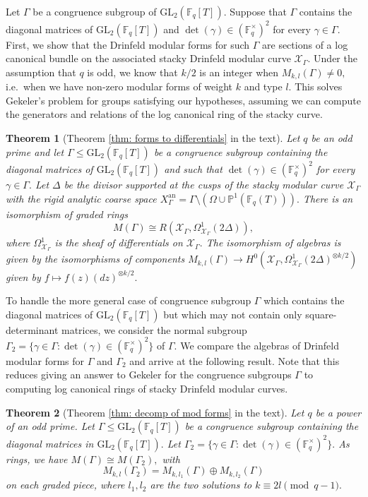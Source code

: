 \documentclass[11pt]{amsart}
\newtheorem{theorem}{Theorem}[section]
\theoremstyle{definition}
\numberwithin{equation}{section}
\newcommand{\GL}{\mathrm{GL}} 	%
\newcommand{\sX}{\mathscr{X}}		%
\newcommand{\bbF}{\mathbb{F}}		%
\newcommand{\bbP}{\mathbb{P}}		%
\begin{document}
		Let $\Gamma$ be a congruence subgroup of $\GL_2(\bbF_q[T]).$ Suppose that $\Gamma$ contains the diagonal matrices of $\GL_2(\bbF_q[T])$ and $\det(\gamma)\in (\bbF_q^{\times})^2$ for every $\gamma\in \Gamma.$ First, we show that the Drinfeld modular forms for such $\Gamma$ are sections of a log canonical bundle on the associated stacky Drinfeld modular curve $\sX_{\Gamma}.$ Under the assumption that $q$ is odd, we know that $k/2$ is an integer when $M_{k,l}(\Gamma)\neq 0,$ i.e.\ when we have non-zero modular forms of weight $k$ and type $l.$ This solves Gekeler's problem for groups satisfying our hypotheses, assuming we can compute the generators and relations of the log canonical ring of the stacky curve.
		\begin{theorem}[Theorem \ref{thm: forms to differentials} in the text]
			Let $q$ be an odd prime and let $\Gamma\leq \GL_2(\bbF_q[T])$ be a congruence subgroup containing the diagonal matrices of $\GL_2(\bbF_q[T])$ and such that $\det(\gamma)\in (\bbF_q^{\times})^2$ for every $\gamma\in \Gamma.$ Let $\Delta$ be the divisor supported at the cusps of the stacky modular curve $\sX_{\Gamma}$ with the rigid analytic coarse space $X_{\Gamma}^{\text{an}}=\Gamma\setminus(\Omega\cup \bbP^1(\bbF_q(T))).$ 
			There is an isomorphism of graded rings \[M(\Gamma)\cong R(\sX_{\Gamma},\Omega^1_{\sX_{\Gamma}}(2\Delta)),\] where $\Omega^1_{\sX_{\Gamma}}$ is the sheaf of differentials on $\sX_{\Gamma}.$ The isomorphism of algebras is given by the isomorphisms of components $M_{k,l}(\Gamma)\to H^0(\sX_{\Gamma},\Omega^1_{\sX_{\Gamma}}(2\Delta)^{\otimes k/2})$ given by $f\mapsto f(z)(dz)^{\otimes k/2}.$ 
		\end{theorem}
		
		To handle the more general case of congruence subgroup $\Gamma$ which contains the diagonal matrices of $\GL_2(\bbF_q[T])$ but which may not contain only square-determinant matrices, we consider the normal subgroup $\Gamma_2=\{\gamma\in \Gamma: \det(\gamma)\in (\bbF_q^{\times})^2\}$ of $\Gamma.$ We compare the algebras of Drinfeld modular forms for $\Gamma$ and $\Gamma_2$ and arrive at the following result. Note that this reduces giving an answer to Gekeler for the congruence subgroups $\Gamma$ to computing log canonical rings of stacky Drinfeld modular curves.
		\begin{theorem}[Theorem \ref{thm: decomp of mod forms} in the text]
			Let $q$ be a power of an odd prime. Let $\Gamma\leq \GL_2(\bbF_q[T])$ be a congruence subgroup containing the diagonal matrices in $\GL_2(\bbF_q[T]).$ Let $\Gamma_2=\{\gamma\in \Gamma: \det(\gamma)\in (\bbF_q^{\times})^2\}.$ As rings, we have
			$M(\Gamma)\cong M(\Gamma_2),$
			with \[M_{k,l}(\Gamma_2)=M_{k,l_1}(\Gamma)\oplus M_{k,l_2}(\Gamma)\] on each graded piece, where $l_1,l_2$ are the two solutions to $k\equiv 2l\pmod{q-1}.$ 
		\end{theorem}
		
\end{document}
